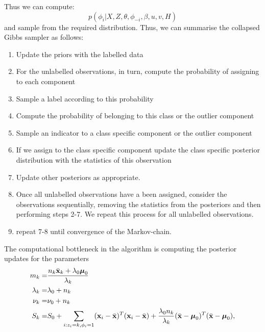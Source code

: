 \documentclass[12pt,english]{article}
\begin{document}
Thus we can compute:
\begin{equation}
p(\phi_i|X,Z,\theta, \phi_{-i}, \beta, u,v, H)
\end{equation}
and sample from the required distribution. Thus, we can summarise the collapsed Gibbs sampler as follows:
\begin{enumerate}
\item Update the priors with the labelled data\\
\item For the unlabelled observations, in turn, compute the probability of assigning to each component\\
\item Sample a label according to this probability \\
\item Compute the probability of belonging to this class or the outlier component \\
\item Sample an indicator to a class specific component or the outlier component \\
\item If we assign to the class specific component update the class specific posterior distribution with the statistics of this observation \\
\item Update other posteriors as appropriate.
\item Once all unlabelled observations have a been assigned, consider the observations sequentially, removing the statistics from the posteriors and then performing steps 2-7. We repeat this process for all unlabelled observations.
\item repeat 7-8 until convergence of the Markov-chain.
\end{enumerate}
The computational bottleneck in the algorithm is computing the posterior updates for the parameters
\begin{equation}
\begin{split}
m_k = & \frac{n_k\bar{{\bf x}}_k + \lambda_0 \boldsymbol{\mu}_0}{\lambda_k}\\
\lambda_k = & \lambda_0 + n_k\\
\nu_k = & \nu_0 + n_k \\
S_k = & S_0 + \sum_{i:z_i = k, \phi_i = 1}({\bf x}_i - \bar{{\bf x}})^{T}({\bf x}_i - \bar{{\bf x}}) + \frac{\lambda_0n_k}{\lambda_k}(\bar{{\bf x}}- \boldsymbol{\mu}_0)^T(\bar{{\bf x}} - \boldsymbol{\mu}_0), \\
\end{split}
\end{equation}
\end{document}
